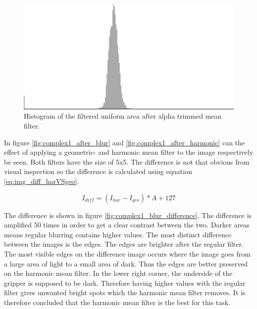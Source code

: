 \begin{figure}[H]
\centering
\includegraphics[width = \histogramWidth]{graphics/hist1_uniform2.png}
\caption{Histogram of the filtered uniform area after alpha trimmed mean filter.}
\label{fig:hist_img1_after_alpha}
\end{figure}

In figure \ref{fig:complex1_after_blur} and \ref{fig:complex1_after_harmonic} can the effect of applying a geometric- and harmonic mean filter to the image respectively be seen.
Both filters have the size of 5x5. 
The difference is not that obvious from visual inspection so the difference is calculated using equation \ref{eq:img_diff_harVSgeo}.

\begin{equation}
I_{diff} = \left( I_{har} - I_{geo} \right) * A + 127
\label{eq:img_diff_harVSgeo}
\end{equation}

The difference is shown in figure \ref{fig:complex1_blur_difference}.
The difference is amplified 50 times in order to get a clear contrast between the two.
Darker areas means regular blurring contains higher values.
The most distinct difference between the images is the edges. 
The edges are brighter after the regular filter. 
The most visible edges on the difference image occurs where the image goes from a large area of light to a small area of dark.
Thus the edges are better preserved on the harmonic mean filter.
In the lower right corner, the underside of the gripper is supposed to be dark.
Therefore having higher values with the regular filter gives unwanted bright spots which the harmonic mean filter removes.
It is therefore concluded that the harmonic mean filter is the best for this task.



